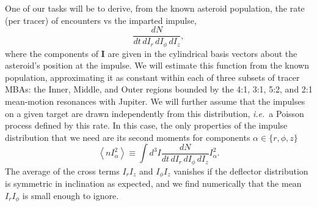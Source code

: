 \documentclass[linenumbers, onecolumn]{aastex631}
\newcommand{\ie}{\textit{i.e.\/}}
\newcommand{\vecI}{\mathbf{I}}
\begin{document}
One of our tasks will be to derive, from the known asteroid population, the rate (per tracer) of encounters vs the imparted impulse,
\begin{equation}
  \frac{dN}{dt\,dI_r\,dI_\phi\,dI_z},
  \label{eq:dN}
\end{equation}
where the components of $\vecI$ are given in the cylindrical basis
vectors about the asteroid's position at the impulse.
We will estimate this function from the known population,
approximating it as constant within each of three subsets of tracer MBAs:
the Inner, Middle, and Outer regions bounded by the 4:1, 3:1,
5:2, and 2:1 mean-motion resonances with Jupiter.
We will further assume that the impulses on a given target are drawn
independently from this distribution, \ie\ a Poisson process defined
by this rate.  In this case, the only properties of the impulse
distribution that we need are its second moments for components $\alpha \in \{r,\phi,z\}$
\begin{equation}
  \left \langle n I_\alpha^2 \right\rangle \equiv \int d^3I \frac{dN}{dt\,dI_r\,dI_\phi\,dI_z} I_\alpha^2.
\label{eq:nvsq}
\end{equation}
The average of the cross terms $I_rI_z$ and $I_\phi I_z$ vanishes if
the deflector distribution is symmetric in inclination as expected, and we find numerically that the mean $I_rI_\phi$ is small enough to ignore.
\end{document}
